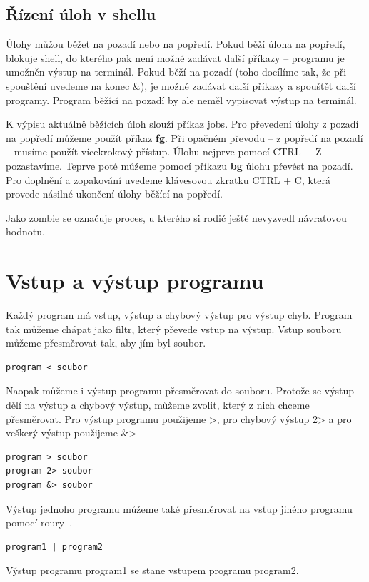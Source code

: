 \documentclass{article}
\begin{document}
\subsection{Řízení úloh v shellu}
Úlohy můžou běžet na pozadí nebo na popředí. Pokud běží úloha na popředí, blokuje shell, do kterého pak není možné zadávat další příkazy -- programu je umožněn výstup na terminál. Pokud běží na pozadí (toho docílíme tak, že při spouštění uvedeme na konec \&), je možné zadávat další příkazy a spouštět další programy. Program běžící na pozadí by ale neměl vypisovat výstup na terminál.

K výpisu aktuálně běžících úloh slouží příkaz jobs. Pro převedení úlohy z pozadí na popředí můžeme použít příkaz \textbf{fg}. Při opačném převodu -- z popředí na pozadí -- musíme použít vícekrokový přístup. Úlohu nejprve pomocí CTRL + Z pozastavíme. Teprve poté můžeme pomocí příkazu \textbf{bg} úlohu převést na pozadí. Pro doplnění a zopakování uvedeme klávesovou zkratku CTRL + C, která provede násilné ukončení úlohy běžící na popředí.	

Jako zombie se označuje proces, u kterého si rodič ještě nevyzvedl návratovou hodnotu.

\section{Vstup a výstup programu}
Každý program má vstup, výstup a chybový výstup pro výstup chyb. Program tak můžeme chápat jako filtr, který převede vstup na výstup. Vstup souboru můžeme přesměrovat tak, aby jím byl soubor.
\begin{verbatim}
program < soubor
\end{verbatim}

Naopak můžeme i výstup programu přesměrovat do souboru. Protože se výstup dělí na výstup a chybový výstup, můžeme zvolit, který z nich chceme přesměrovat. Pro výstup programu použijeme \textgreater, pro chybový výstup 2\textgreater{} a pro veškerý výstup použijeme \&\textgreater
\begin{verbatim}
program > soubor
program 2> soubor
program &> soubor
\end{verbatim}

Výstup jednoho programu můžeme také přesměrovat na vstup jiného programu pomocí roury~\textpipe. 
\begin{verbatim}
program1 | program2
\end{verbatim} 
Výstup programu program1 se stane vstupem programu program2.
\end{document}
